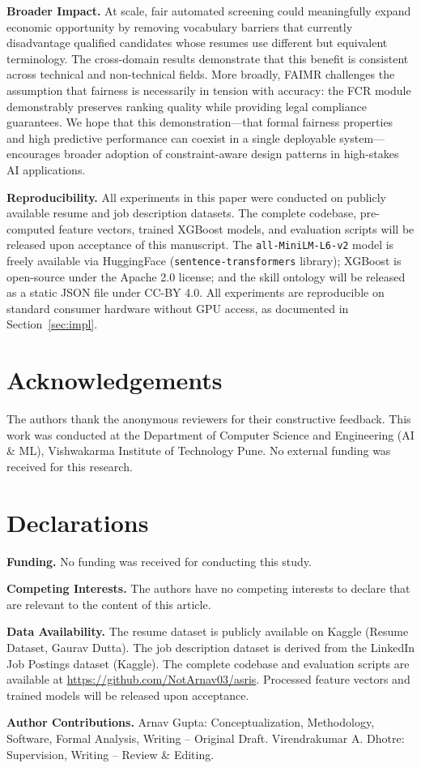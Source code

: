 \documentclass[smallcondensed,numbers]{sn-jnl}
\begin{document}
\textbf{Broader Impact.} At scale, fair automated screening could meaningfully expand economic opportunity by removing vocabulary barriers that currently disadvantage qualified candidates whose resumes use different but equivalent terminology. The cross-domain results demonstrate that this benefit is consistent across technical and non-technical fields. More broadly, FAIMR challenges the assumption that fairness is necessarily in tension with accuracy: the FCR module demonstrably preserves ranking quality while providing legal compliance guarantees. We hope that this demonstration---that formal fairness properties and high predictive performance can coexist in a single deployable system---encourages broader adoption of constraint-aware design patterns in high-stakes AI applications.

\textbf{Reproducibility.} All experiments in this paper were conducted on publicly available resume and job description datasets. The complete codebase, pre-computed feature vectors, trained XGBoost models, and evaluation scripts will be released upon acceptance of this manuscript. The \texttt{all-MiniLM-L6-v2} model is freely available via HuggingFace (\texttt{sentence-transformers} library); XGBoost is open-source under the Apache 2.0 license; and the skill ontology will be released as a static JSON file under CC-BY 4.0. All experiments are reproducible on standard consumer hardware without GPU access, as documented in Section~\ref{sec:impl}.

\section*{Acknowledgements}
The authors thank the anonymous reviewers for their constructive feedback. This work was conducted at the Department of Computer Science and Engineering (AI \& ML), Vishwakarma Institute of Technology Pune. No external funding was received for this research.

\section*{Declarations}

\textbf{Funding.} No funding was received for conducting this study.

\textbf{Competing Interests.} The authors have no competing interests to declare that are relevant to the content of this article.

\textbf{Data Availability.} The resume dataset is publicly available on Kaggle (Resume Dataset, Gaurav Dutta). The job description dataset is derived from the LinkedIn Job Postings dataset (Kaggle). The complete codebase and evaluation scripts are available at \url{https://github.com/NotArnav03/asris}. Processed feature vectors and trained models will be released upon acceptance.

\textbf{Author Contributions.} Arnav Gupta: Conceptualization, Methodology, Software, Formal Analysis, Writing -- Original Draft. Virendrakumar A. Dhotre: Supervision, Writing -- Review \& Editing.



\end{document}
